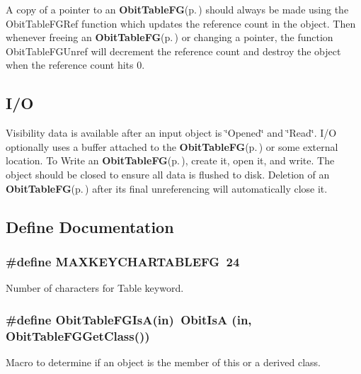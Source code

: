 A copy of a pointer to an {\bf Obit\-Table\-FG}{\rm (p.\,\pageref{structObitTableFG})} should always be made using the Obit\-Table\-FGRef function which updates the reference count in the object. Then whenever freeing an {\bf Obit\-Table\-FG}{\rm (p.\,\pageref{structObitTableFG})} or changing a pointer, the function Obit\-Table\-FGUnref will decrement the reference count and destroy the object when the reference count hits 0.\subsection{I/O}\label{ObitTableFG_8h_ObitTableFGUsage}
Visibility data is available after an input object is \char`\"{}Opened\char`\"{} and \char`\"{}Read\char`\"{}. I/O optionally uses a buffer attached to the {\bf Obit\-Table\-FG}{\rm (p.\,\pageref{structObitTableFG})} or some external location. To Write an {\bf Obit\-Table\-FG}{\rm (p.\,\pageref{structObitTableFG})}, create it, open it, and write. The object should be closed to ensure all data is flushed to disk. Deletion of an {\bf Obit\-Table\-FG}{\rm (p.\,\pageref{structObitTableFG})} after its final unreferencing will automatically close it.

\subsection{Define Documentation}
\subsubsection{\setlength{\rightskip}{0pt plus 5cm}\#define MAXKEYCHARTABLEFG\ 24}\label{ObitTableFG_8h_a0}


Number of characters for Table keyword. 

\subsubsection{\setlength{\rightskip}{0pt plus 5cm}\#define Obit\-Table\-FGIs\-A(in)\ Obit\-Is\-A (in, Obit\-Table\-FGGet\-Class())}\label{ObitTableFG_8h_a3}


Macro to determine if an object is the member of this or a derived class. 

